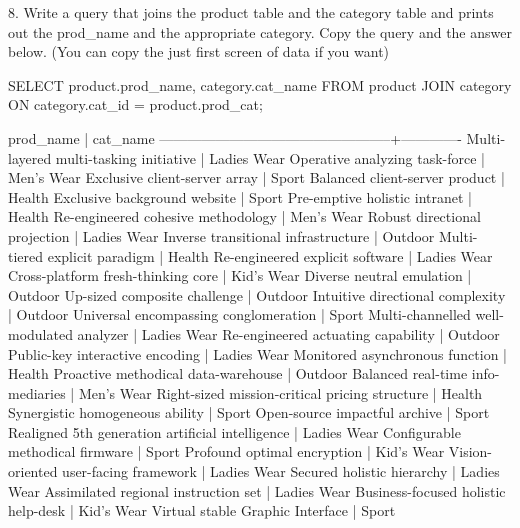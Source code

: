 8. Write a query that joins the product table and the category table and prints out the prod\_name and the appropriate category. Copy the query and the answer below. (You can copy the just first screen of data if you want)
\begin{sql}
SELECT product.prod_name, category.cat_name FROM product
JOIN category ON category.cat_id = product.prod_cat;
\end{sql}
\begin{pseudo*}
                    prod_name                     |  cat_name   
--------------------------------------------------+-------------
 Multi-layered multi-tasking initiative           | Ladies Wear
 Operative analyzing task-force                   | Men's Wear
 Exclusive client-server array                    | Sport
 Balanced client-server product                   | Health
 Exclusive background website                     | Sport
 Pre-emptive holistic intranet                    | Health
 Re-engineered cohesive methodology               | Men's Wear
 Robust directional projection                    | Ladies Wear
 Inverse transitional infrastructure              | Outdoor
 Multi-tiered explicit paradigm                   | Health
 Re-engineered explicit software                  | Ladies Wear
 Cross-platform fresh-thinking core               | Kid's Wear
 Diverse neutral emulation                        | Outdoor
 Up-sized composite challenge                     | Outdoor
 Intuitive directional complexity                 | Outdoor
 Universal encompassing conglomeration            | Sport
 Multi-channelled well-modulated analyzer         | Ladies Wear
 Re-engineered actuating capability               | Outdoor
 Public-key interactive encoding                  | Ladies Wear
 Monitored asynchronous function                  | Health
 Proactive methodical data-warehouse              | Outdoor
 Balanced real-time info-mediaries                | Men's Wear
 Right-sized mission-critical pricing structure   | Health
 Synergistic homogeneous ability                  | Sport
 Open-source impactful archive                    | Sport
 Realigned 5th generation artificial intelligence | Ladies Wear
 Configurable methodical firmware                 | Sport
 Profound optimal encryption                      | Kid's Wear
 Vision-oriented user-facing framework            | Ladies Wear
 Secured holistic hierarchy                       | Ladies Wear
 Assimilated regional instruction set             | Ladies Wear
 Business-focused holistic help-desk              | Kid's Wear
 Virtual stable Graphic Interface                 | Sport

\end{pseudo*}
